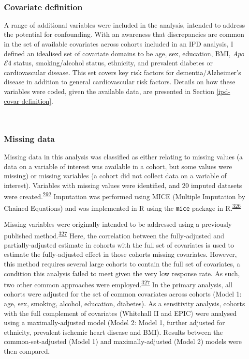 \documentclass[a4paper, twoside]{templates/ociamthesis}
\begin{document}
~

\hypertarget{covariate-definition}{%
\subsubsection{Covariate definition}\label{covariate-definition}}

A range of additional variables were included in the analysis, intended to address the potential for confounding. With an awareness that discrepancies are common in the set of available covariates across cohorts included in an IPD analysis, I defined an idealised set of covariate domains to be age, sex, education, BMI, \emph{Apo}\(\mathcal{E}4\) status, smoking/alcohol status, ethnicity, and prevalent diabetes or cardiovascular disease. This set covers key risk factors for dementia/Alzheimer's disease in addition to general cardiovascular risk factors. Details on how these variables were coded, given the available data, are presented in Section \ref{ipd-covar-definition}.

~

\hypertarget{missing-data-2}{%
\subsubsection{Missing data}\label{missing-data-2}}

Missing data in this analysis was classified as either relating to missing values (a data on a variable of interest was available in a cohort, but some values were missing) or missing variables (a cohort did not collect data on a variable of interest). Variables with missing values were identified, and 20 imputed datasets were created.\textsuperscript{\protect\hyperlink{ref-sterne2009}{292}} Imputation was performed using MICE (Multiple Imputation by Chained Equations) and was implemented in R using the \texttt{mice} package in R.\textsuperscript{\protect\hyperlink{ref-Van_Buuren2011-nc}{326}}

Missing variables were originally intended to be addressed using a previously published method.\textsuperscript{\protect\hyperlink{ref-fibrinogenstudiescollaboration2009}{327}} Here, the correlation between the fully-adjusted and partially-adjusted estimate in cohorts with the full set of covariates is used to estimate the fully-adjusted effect in those cohorts missing covariates. However, this method requires several large cohorts to contain the full set of covariates, a condition this analysis failed to meet given the very low response rate. As such, two other common approaches were employed.\textsuperscript{\protect\hyperlink{ref-fibrinogenstudiescollaboration2009}{327}} In the primary analysis, all cohorts were adjusted for the set of common covariates across cohorts (Model 1: age, sex, smoking, alcohol, education, diabetes). As a sensitivity analysis, cohorts with the full complement of covariates (Whitehall II and EPIC) were analysed using a maximally-adjusted model (Model 2: Model 1, further adjusted for ethnicity, prevalent ischemic heart disease and BMI). Results between the common-set-adjusted (Model 1) and maximally-adjusted (Model 2) models were then compared.
\end{document}
